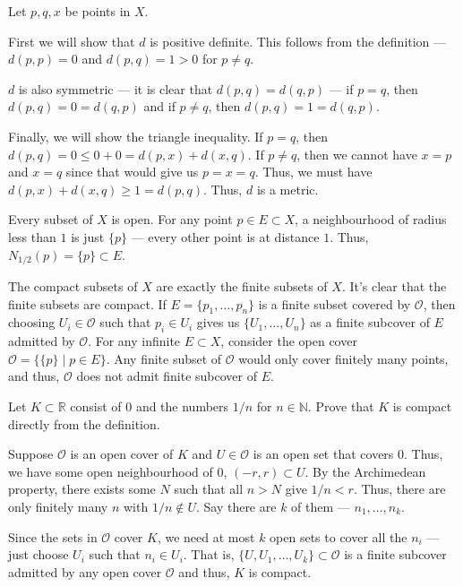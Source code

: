 \documentclass[12 pt, letterpaper]{hmcpset}
\begin{document}
\begin{solution}
	Let $p, q, x$ be points in $X$.

	First we will show that $d$ is positive definite. This follows from the definition --- $d(p, p) = 0$ and $d(p, q) = 1 > 0$ for $p \neq q$.

	$d$ is also symmetric --- it is clear that $d(p, q) = d(q, p)$ --- if $p = q$, then $d(p, q) = 0 = d(q, p)$ and if $p \neq q$, then $d(p, q) = 1 = d(q, p)$.

	Finally, we will show the triangle inequality. If $p = q$, then $d(p, q) = 0 \le 0 + 0 = d(p, x) + d(x, q)$. If $p \neq q$, then we cannot have $x = p$ and $x = q$ since that would give us $p = x = q$. Thus, we must have $d(p, x) + d(x, q) \ge 1 = d(p, q)$. Thus, $d$ is a metric.

	Every subset of $X$ is open. For any point $p \in E \subset X$, a neighbourhood of radius less than $1$ is just $\{ p \}$ --- every other point is at distance $1$. Thus, $N_{1/2}(p) = \{ p \} \subset E$.

	The compact subsets of $X$ are exactly the finite subsets of $X$. It's clear that the finite subsets are compact. If  $E = \{ p_{1}, \dots, p_{n} \}$ is a finite subset covered by $\mathcal{O}$, then choosing $U_{i} \in \mathcal{O}$ such that $p_{i} \in U_{i}$ gives us $\{ U_{1}, \dots, U_{n} \}$ as a finite subcover of $E$ admitted by $\mathcal{O}$. For any infinite $E \subset X$, consider the open cover  $\mathcal{O} = \{ \{ p \} \mid p \in E \}$. Any finite subset of $\mathcal{O}$ would only cover finitely many points, and thus, $\mathcal{O}$ does not admit finite subcover of $E$.
\end{solution}

\pagebreak

\begin{problem}
	Let $K \subset \mathbb{R}$ consist of $0$ and the numbers $1/n$ for $n \in \mathbb{N}$. Prove that $K$ is compact directly from the definition.
\end{problem}

\begin{solution}
	Suppose $\mathcal{O}$ is an open cover of $K$ and $U \in \mathcal{O}$ is an open set that covers $0$. Thus, we have some open neighbourhood of $0$, $(-r, r) \subset U$. By the Archimedean property, there exists some $N$  such that all $n > N$ give $1/n < r$. Thus, there are only finitely many $n$ with $1/n \notin U$. Say there are $k$ of them --- $n_{1}, \dots, n_{k}$.

	Since the sets in $\mathcal{O}$ cover $K$, we need at most $k$ open sets to cover all the $n_{i}$ --- just choose $U_{i}$ such that $n_{i} \in U_{i}$. That is, $\{ U, U_{1}, \dots, U_{k} \} \subset \mathcal{O}$ is a finite subcover admitted by any open cover $\mathcal{O}$ and thus, $K$ is compact.
\end{solution}
\end{document}
